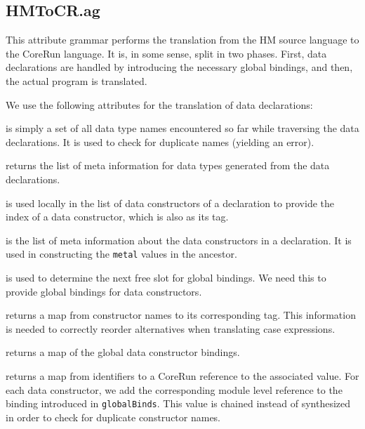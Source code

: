 \documentclass{scrartcl}
\newcommand{\attrdesc}[2]{\texttt{#1}, \emph{#2}}
\begin{document}
\subsection{HMToCR.ag}

This attribute grammar performs the translation from the HM source language to the CoreRun language. It is, in some sense, split in two phases. First, data declarations are handled by introducing the necessary global bindings, and then, the actual program is translated.

We use the following attributes for the translation of data declarations:

\begin{description}[style=multiline,leftmargin=4cm,font=\normalfont]

\item[\attrdesc{names :: Set Name}{chained}] is simply a set of all data type names encountered so far while traversing the data declarations. It is used to check for duplicate names (yielding an error).

\item[\attrdesc{metal :: CR.MetaL}{synthesized}] returns the list of meta information for data types generated from the data declarations.

\item[\attrdesc{conIndex :: Int}{inherited}] is used locally in the list of data constructors of a declaration to provide the index of a data constructor, which is also as its tag.

\item[\attrdesc{metaConl :: CR.MetaDataConL}{synthesized}] is the list of meta information about the data constructors in a declaration. It is used in constructing the \texttt{metal} values in the ancestor.

\item[\attrdesc{globalOffset :: Int}{chained}] is used to determine the next free slot for global bindings. We need this to provide global bindings for data constructors.

\item[\attrdesc{conTags :: TagMap}{synthesized}] returns a map from constructor names to its corresponding tag. This information is needed to correctly reorder alternatives when translating case expressions.

\item[\attrdesc{globalBinds :: GlobalBinds}{synthesized}] returns a map of the global data constructor bindings. \vspace{2em}

\item[\attrdesc{env :: Environment}{chained}] returns a map from identifiers to a CoreRun reference to the associated value. For each data constructor, we add the corresponding module level reference to the binding introduced in \texttt{globalBinds}.
This value is chained instead of synthesized in order to check for duplicate constructor names.

\end{description}
\end{document}
